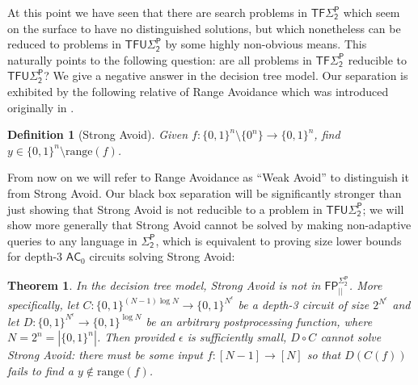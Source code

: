 \documentclass[11pt]{article}
\newtheorem{theorem}{Theorem}
\newtheorem{definition}{Definition}
\newcommand{\B}{\{0,1\}}
\newcommand{\rng}{\mathrm{range}}
\begin{document}
At this point we have seen that there are search problems in $\mathsf{TF\Sigma_2^P}$ which seem on the surface to have no distinguished solutions, but which nonetheless can be reduced to problems in $\mathsf{TFU\Sigma_2^P}$ by some highly non-obvious means. This naturally points to the following question: are all problems in $\mathsf{TF\Sigma_2^P}$ reducible to $\mathsf{TFU\Sigma_2^P}$? We give a negative answer in the decision tree model. Our separation is exhibited by the following relative of Range Avoidance which was introduced originally in \cite{KKMP}.
\begin{definition}[Strong Avoid]
Given $f: \B^n \setminus \{0^n\} \to \B^n$, find $y \in \B^n \setminus \rng(f)$.
\end{definition}
From now on we will refer to Range Avoidance as ``Weak Avoid'' to distinguish it from Strong Avoid. Our black box separation will be significantly stronger than just showing that Strong Avoid is not reducible to a problem in $\mathsf{TFU\Sigma_2^P}$; we will show more generally that Strong Avoid cannot be solved by making non-adaptive queries to any language in $\mathsf{\Sigma_2^P}$, which is equivalent to proving size lower bounds for depth-3 $\mathsf{AC}_0$ circuits solving Strong Avoid: 

\begin{theorem}
\label{thm:strongavoid-lb}
In the decision tree model, Strong Avoid is not in $\mathsf{FP_{||}^{\Sigma_2^P}}$. More specifically, let ${C:\B^{(N-1) \log N } \to \B^{N^{\epsilon}}}$ be a depth-3 circuit of size $2^{N^{\epsilon}}$  and let $D: \B^{N^{\epsilon}} \to \B^{ \log N}$ be an arbitrary postprocessing function, where $N=2^n = |\{0,1\}^n|$. Then provided $\epsilon$ is sufficiently small, $D \circ C$ cannot solve Strong Avoid: there must be some input $f: [N-1] \to [N]$ so that $D(C(f))$ fails to find a $y \notin \rng(f)$.
\end{theorem}
\end{document}
